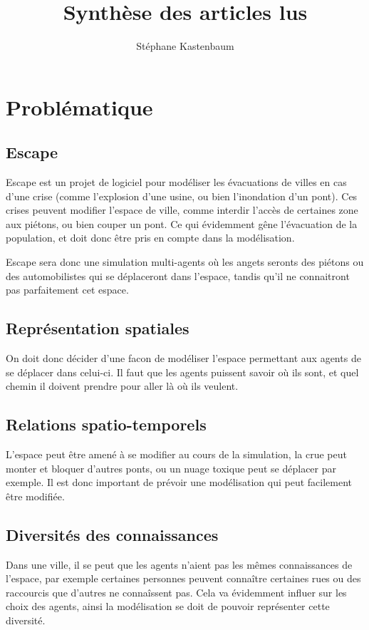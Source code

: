 \documentclass[a4paper]{article}
\title{Synthèse des articles lus}
\author{Stéphane Kastenbaum}
\begin{document}
\maketitle

\section{Problématique}
\subsection{Escape}

Escape est un projet de logiciel pour modéliser les évacuations de villes en cas
d'une crise (comme l'explosion d'une usine, ou bien l'inondation d'un pont).
Ces crises peuvent modifier l'espace de ville, comme interdir l'accès de
certaines zone aux piétons, ou bien couper un pont. Ce qui évidemment gêne
l'évacuation de la population, et doit donc être pris en compte dans la
modélisation.

Escape sera donc une simulation multi-agents où les angets seronts des piétons
ou des automobilistes qui se déplaceront dans l'espace, tandis qu'il ne
connaitront pas parfaitement cet espace.

\subsection{Représentation spatiales}

On doit donc décider d'une facon de modéliser l'espace permettant aux agents de
se déplacer dans celui-ci. Il faut que les agents puissent savoir où ils sont,
et quel chemin il doivent prendre pour aller là où ils veulent.

\subsection{Relations spatio-temporels}

L'espace peut être amené à se modifier au cours de la simulation, la crue peut
monter et bloquer d'autres ponts, ou un nuage toxique peut se déplacer par 
exemple. Il est donc important de prévoir une modélisation qui peut facilement
être modifiée.

\subsection{Diversités des connaissances}

Dans une ville, il se peut que les agents n'aient pas les mêmes connaissances
de l'espace, par exemple certaines personnes peuvent connaître certaines rues
ou des raccourcis que d'autres ne connaîssent pas. Cela va évidemment influer
sur les choix des agents, ainsi la modélisation se doit de pouvoir représenter
cette diversité.
\end{document}
